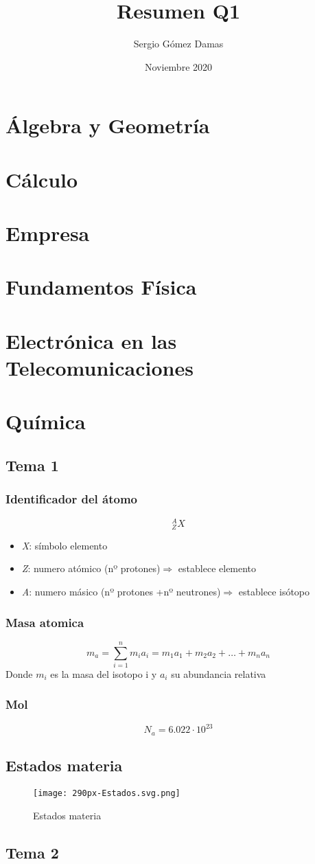 \documentclass[a4paper,12pt]{article}
\title{Resumen Q1}
\author{Sergio Gómez Damas}
\date{Noviembre 2020}
\begin{document}
\maketitle
\newpage
\tableofcontents
\newpage
\section{Álgebra y Geometría}
\newpage
\section{Cálculo}
\newpage
\section{Empresa}
\newpage
\section{Fundamentos Física}
\newpage
\section{Electrónica en las Telecomunicaciones}
\newpage
\section{Química}
\subsection{Tema 1}
\subsubsection{Identificador del átomo}
\begin{equation}
    ^A_Z X
\end{equation}
\begin{itemize}
    \item \emph{X}: símbolo elemento
    \item \emph{Z}: numero atómico (nº protones)$\Rightarrow$ establece elemento
    \item \emph{A}: numero másico (nº protones +nº neutrones)$\Rightarrow$ establece isótopo
\end{itemize}
\subsubsection{Masa atomica}
\begin{equation}
    m_a=\sum^{n}_{i=1}m_ia_i=m_1a_1+m_2a_2+\dots+m_na_n
\end{equation}
Donde $m_i$ es la masa del isotopo i y $a_i$ su abundancia relativa
\subsubsection{Mol}
\begin{equation}
    N_a=6.022\cdot10^{23}
\end{equation}
\subsection{Estados materia}
\begin{figure}[H]
    \centering
    \texttt{[image: 290px-Estados.svg.png]}
    \caption{Estados materia}
    \label{fig:estadosmateria}
\end{figure}

\subsection{Tema 2}
\end{document}
